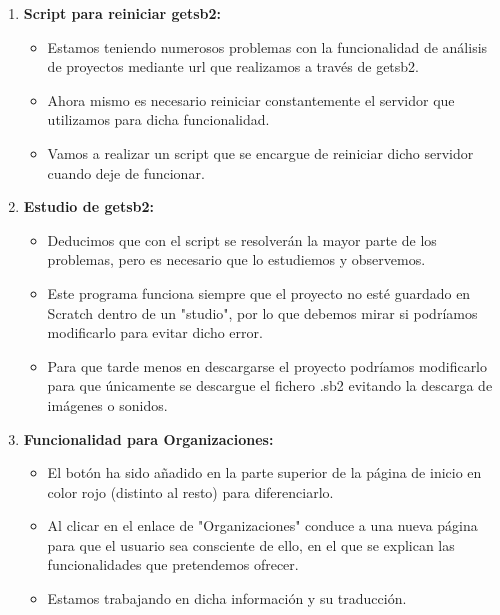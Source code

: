 \documentclass[a4paper,12pt]{letter}
\begin{document}
\begin{letter}
\begin{enumerate}
    
    \item{\textbf {Script para reiniciar getsb2:}}
    \begin{itemize}
            \item {Estamos teniendo numerosos problemas con la funcionalidad 
                    de análisis de proyectos mediante url que realizamos a 
                    través de getsb2.}
            \item {Ahora mismo es necesario reiniciar constantemente el servidor
                    que utilizamos para dicha funcionalidad.}
            \item {Vamos a realizar un script que se encargue de reiniciar dicho
                    servidor cuando deje de funcionar.}
    \end{itemize}
    
    \item{\textbf {Estudio de getsb2:}}
    \begin{itemize}
            \item {Deducimos que con el script se resolverán la mayor parte
                    de los problemas, pero es necesario que lo estudiemos y 
                    observemos.}
            \item {Este programa funciona siempre que el proyecto no esté 
                    guardado en Scratch dentro de un "studio", por lo que debemos
                    mirar si podríamos modificarlo para evitar dicho error.}
            \item {Para que tarde menos en descargarse el proyecto podríamos
                    modificarlo para que únicamente se descargue el fichero
                    .sb2 evitando la descarga de imágenes o sonidos.}
    \end{itemize}

    \item{\textbf {Funcionalidad para Organizaciones:}}
    \begin{itemize}
        \item {El botón ha sido añadido en la parte superior de la página de inicio
                en color rojo (distinto al resto) para diferenciarlo.}
        \item {Al clicar en el enlace de "Organizaciones" conduce a una nueva 
                página para que el usuario sea consciente de ello, en el que 
                se explican las funcionalidades que pretendemos ofrecer.}
        \item {Estamos trabajando en dicha información y su traducción.}
    \end{itemize}



\end{enumerate}
\end{letter}
\end{document}
